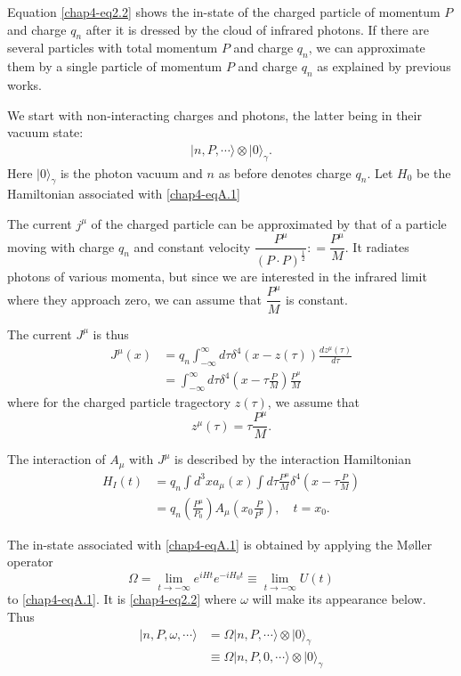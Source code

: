 Equation \eqref{chap4-eq2.2} shows the in-state of the charged particle of momentum $P$ and charge $q_n$ after it is dressed by the cloud of infrared photons. If there are several particles with total momentum $P$ and charge $q_n$, we can approximate them by a single particle of momentum $P$ and charge $q_n$ as explained by previous works.

We start with non-interacting charges and photons, the latter being in their vacuum state:
\begin{align*}
  |n, P, \cdots \rangle \otimes | 0 \rangle_\gamma. \label{chap4-eqA.1}\tag{A.1}
\end{align*}
Here $|0 \rangle_\gamma$ is the photon vacuum and $n$ as before denotes charge $q_n$. Let $H_0$ be the Hamiltonian associated with \eqref{chap4-eqA.1}

The current $j^\mu$ of the charged particle can be approximated by that of a particle moving with charge $q_n$ and constant velocity $\dfrac{P^\mu}{(P\cdot P)^{\frac{1}{2}}}: = \dfrac{P^\mu}{M}$. It radiates photons of various momenta, but since we are interested in the infrared limit where they approach zero, we can assume that $\dfrac{P^\mu}{M}$ is constant.

The current $J^\mu$ is thus
\begin{align*}
  J^\mu (x) & = q_n \int^\infty_{-\infty} d \tau \delta^4 (x- z (\tau)) \frac{dz^\mu(\tau)}{d\tau}\\
  & = \int^\infty_{-\infty} d \tau \delta^4 \left(x- \tau \frac{P}{M}\right) \frac{P^\mu}{M}\label{chap4-eqA.2}\tag{A.2}
\end{align*}
where for the charged particle tragectory $z(\tau)$, we assume that
\begin{equation*}
z^\mu (\tau) = \tau \frac{P^\mu}{M}. \label{chap4-eqA.3}\tag{A.3}
\end{equation*}

The interaction of $A_\mu$ with $J^\mu$ is described by the interaction Hamiltonian
\begin{align*}
  H_I(t) & = q_n \int d^3 x a_\mu (x) \int d \tau \frac{P^\mu}{M} \delta^4 \left( x- \tau \frac{P}{M} \right) \label{chap4-eqA.4}\tag{A.4}\\
  & = q_n \left( \frac{P^\mu}{P_0}\right) A_\mu \left( x_0 \frac{P}{P^0}\right), \quad t= x_0. \label{chap4-eqA.5}\tag{A.5}
\end{align*}

The in-state associated with \eqref{chap4-eqA.1} is obtained by applying the M\o{}ller operator
\begin{equation*}
\Omega = \lim\limits_{t \to -\infty} e^{iHt}e^{-iH_0t}\equiv \lim\limits_{t \to -\infty} U(t)\label{chap4-eqA.6}\tag{A.6}
\end{equation*}
to \eqref{chap4-eqA.1}. It is \eqref{chap4-eq2.2} where $\omega$ will make its appearance below. Thus
\begin{align*}
  | n, P, \omega, \cdots \rangle & = \Omega | n, P, \cdots \rangle \otimes | 0 \rangle_\gamma\\
  & \equiv \Omega|n, P, 0, \cdots \rangle \otimes |0 \rangle_\gamma \label{chap4-eqA.7}\tag{A.7}
\end{align*}

